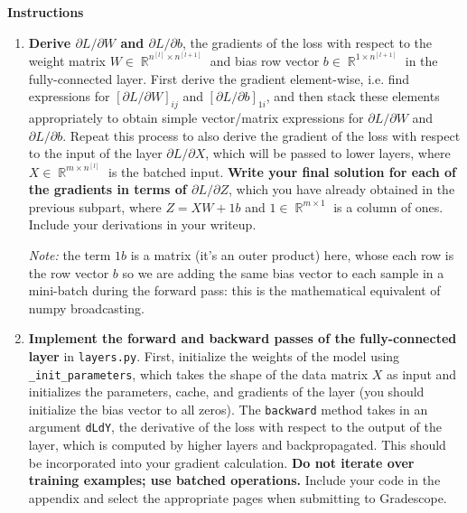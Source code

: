 \documentclass{article}
\DeclareMathOperator{\R}{\mathbb{R}}
\begin{document}
\textbf{Instructions}
\begin{enumerate}
    \item 
    \textbf{Derive $\partial L/\partial W$ and $\partial L/\partial b$}, the gradients of the loss with respect to the weight matrix $W \in \R^{n^{[l]} \times n^{[l+1]}}$ and bias row vector $b \in \R^{1 \times n^{[l+1]}}$ in the fully-connected layer. 
    First derive the gradient element-wise, i.e. find expressions for $\left[\partial L/\partial W\right]_{ij}$ and $\left[\partial L/\partial b\right]_{1i}$, and then stack these elements appropriately to obtain simple vector/matrix expressions for $\partial L/\partial W$ and $\partial L/\partial b$. 
    Repeat this process to also derive the gradient of the loss with respect to the input of the layer $\partial L/\partial X$, which will be passed to lower layers, where $X \in \R^{m \times n^{[l]}}$ is the batched input. 
    \textbf{Write your final solution for each of the gradients in terms of $\partial L/\partial Z$}, which you have already obtained in the previous subpart, where $Z = XW+1b$ and $1 \in \R^{m \times 1}$ is a column of ones. 
    Include your derivations in your writeup.
    
    \textit{Note:} the term $1b$ is a matrix (it's an outer product) here, whose each row is the row vector $b$ so we are adding the same bias vector to each sample in a mini-batch during the forward pass: this is the mathematical equivalent of numpy broadcasting.
    
    \item 
    \textbf{Implement the forward and backward passes of the fully-connected layer} in \texttt{layers.py}. 
    First, initialize the weights of the model using \texttt{\_init\_parameters}, which takes the shape of the data matrix $X$ as input and initializes the parameters, cache, and gradients of the layer (you should initialize the bias vector to all zeros). 
    The \texttt{backward} method takes in an argument \texttt{dLdY}, the derivative of the loss with respect to the output of the layer, which is computed by higher layers and backpropagated. 
    This should be incorporated into your gradient calculation. 
    \textbf{Do not iterate over training examples; use batched operations.} 
    Include your code in the appendix and select the appropriate pages when submitting to Gradescope.
\end{enumerate}
\end{document}
